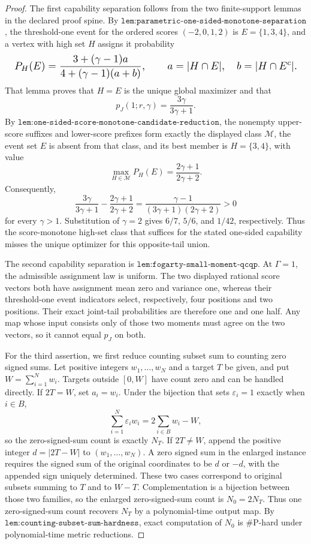 \documentclass{article}
\begin{document}
\begin{proof}
The first capability separation follows from the two finite-support lemmas in the declared proof spine. By \(\texttt{lem:parametric-one-sided-monotone-separation}\), the threshold-one event for the ordered scores \((-2,0,1,2)\) is \(E=\{1,3,4\}\), and a vertex with high set \(H\) assigns it probability
\[
\makebox[\linewidth][c]{\resizebox{0.98\linewidth}{!}{\(\displaystyle P_H(E)=\frac{3+(\gamma-1)a}{4+(\gamma-1)(a+b)},
\qquad
 a=\lvert H\cap E\rvert,
\quad
 b=\lvert H\cap E^c\rvert.\)}}
\]
That lemma proves that \(H=E\) is the unique global maximizer and that
\[
p_J(1;r,\gamma)=\frac{3\gamma}{3\gamma+1}.
\]
By \(\texttt{lem:one-sided-score-monotone-candidate-reduction}\), the nonempty upper-score suffixes and lower-score prefixes form exactly the displayed class \(\mathcal M\), the event set \(E\) is absent from that class, and its best member is \(H=\{3,4\}\), with value
\[
\max_{H\in\mathcal M}P_H(E)=\frac{2\gamma+1}{2\gamma+2}.
\]
Consequently,
\[
\frac{3\gamma}{3\gamma+1}-\frac{2\gamma+1}{2\gamma+2}
 =\frac{\gamma-1}{(3\gamma+1)(2\gamma+2)}>0
\]
for every \(\gamma>1\). Substitution of \(\gamma=2\) gives \(6/7\), \(5/6\), and \(1/42\), respectively. Thus the score-monotone high-set class that suffices for the stated one-sided capability misses the unique optimizer for this opposite-tail union.

The second capability separation is \(\texttt{lem:fogarty-small-moment-qcqp}\). At \(\Gamma=1\), the admissible assignment law is uniform. The two displayed rational score vectors both have assignment mean zero and variance one, whereas their threshold-one event indicators select, respectively, four positions and two positions. Their exact joint-tail probabilities are therefore one and one half. Any map whose input consists only of those two moments must agree on the two vectors, so it cannot equal \(p_J\) on both.

For the third assertion, we first reduce counting subset sum to counting zero signed sums. Let positive integers \(w_1,\ldots,w_N\) and a target \(T\) be given, and put \(W=\sum_{i=1}^N w_i\). Targets outside \([0,W]\) have count zero and can be handled directly. If \(2T=W\), set \(a_i=w_i\). Under the bijection that sets \(\varepsilon_i=1\) exactly when \(i\in B\),
\[
\sum_{i=1}^N\varepsilon_iw_i
 =2\sum_{i\in B}w_i-W,
\]
so the zero-signed-sum count is exactly \(N_T\). If \(2T\ne W\), append the positive integer \(d=\lvert2T-W\rvert\) to \((w_1,\ldots,w_N)\). A zero signed sum in the enlarged instance requires the signed sum of the original coordinates to be \(d\) or \(-d\), with the appended sign uniquely determined. These two cases correspond to original subsets summing to \(T\) and to \(W-T\). Complementation is a bijection between those two families, so the enlarged zero-signed-sum count is \(N_0=2N_T\). Thus one zero-signed-sum count recovers \(N_T\) by a polynomial-time output map. By \(\texttt{lem:counting-subset-sum-hardness}\), exact computation of \(N_0\) is \(\#\mathrm P\)-hard under polynomial-time metric reductions.


\end{proof}
\end{document}
